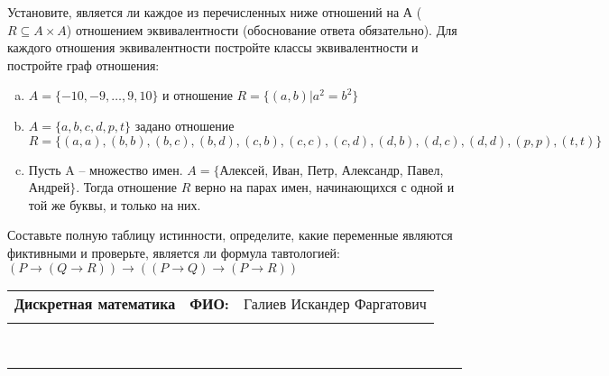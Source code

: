 \documentclass[10pt]{exam}
\newcommand{\class}{Дискретная математика}
\newcommand{\examdate}{}
\begin{document}
\begin{questions}
\question
Установите, является ли каждое из перечисленных ниже отношений на А ($R \subseteq A \times A$) отношением эквивалентности (обоснование ответа обязательно). Для каждого отношения эквивалентности постройте классы 
эквивалентности и постройте граф отношения:
\begin{enumerate} [a)]\setcounter{enumi}{0}
\item $A = \{-10, -9, … , 9, 10\}$ и отношение $R = \{(a,b)|a^{2} = b^{2}\}$
\item $A = \{a, b, c, d, p, t\}$ задано отношение $R = \{(a, a), (b, b), (b, c), (b, d), (c, b), (c, c), (c, d), (d, b), (d, c), (d, d), (p,p), (t,t)\}$
\item Пусть A – множество имен. $A = \{ $Алексей, Иван, Петр, Александр, Павел, Андрей$ \}$. Тогда отношение $R$ верно на парах имен, начинающихся с одной и той же буквы, и только на них.
\end{enumerate}\question Составьте полную таблицу истинности, определите, какие переменные являются фиктивными и проверьте, является ли формула тавтологией:
$(P \rightarrow (Q \rightarrow R)) \rightarrow ((P \rightarrow Q) \rightarrow (P \rightarrow R))$

\end{questions}
\newpage
\begin{flushright}
\begin{tabular}{p{2.8in} r l}
\textbf{\class} & \textbf{ФИО:} &Галиев Искандер Фаргатович
\\

\textbf{\examdate} &&\\
\end{tabular}\\
\end{flushright}
\rule[1ex]{\textwidth}{.1pt}
\end{document}
